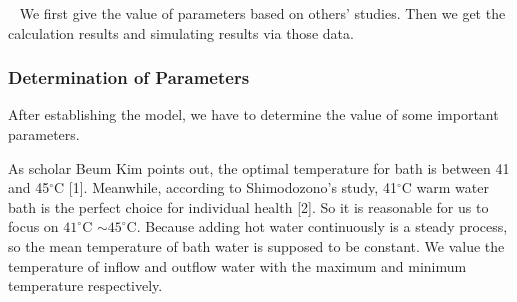 \documentclass{mcmthesis}
\begin{document}


\quad~ We first give the value of parameters based on others’ studies. Then we get the calculation results and simulating results via those data.

\subsubsection{Determination of Parameters}

After establishing the model, we have to determine the value of some
important parameters.

As scholar Beum Kim points out, the optimal temperature for bath is
between 41 and 45$^\circ$C [1]. Meanwhile, according to Shimodozono's study, 41$^\circ$C warm water bath is the perfect choice for individual health [2]. So it is reasonable for us to focus on $41^\circ$C $\sim 45^\circ$C. Because adding hot water continuously is a steady process, so the mean temperature of bath water is supposed to be constant. We value the temperature of inflow and outflow water with the maximum and minimum temperature respectively.
\end{document}
